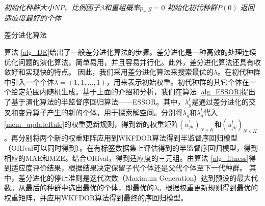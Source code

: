 \IncMargin{1em}
\begin{algorithm}
\emph{初始化种群大小$NP$、比例因子$\beta$和重组概率$p_{r}$}\;
\emph{$g=0$}\;
\emph{初始化初代种群$P(0)$}\;
\emph{返回适应度最好的个体}\;
\caption{差分进化算法}\label{alg_DE}
\end{algorithm}\DecMargin{1em}


算法 \ref{alg_DE}给出了一般差分进化算法的步骤。差分进化是一种高效的处理连续优化问题的演化算法，简单易用，并且容易并行化\citep{storn1997differential}。此外，差分进化算法还具有收敛好和实现快的特点\citep{price2006differential}。
因此，我们采用差分进化算法来搜索最优的\(\lambda\)。在初代种群中引入一个个体\(\lambda=(1,1,\dots,1)\)，用来表示初始权重。初代种群的其它个体在一个给定范围内随机生成。基于上面的介绍和分析，我们在算法 \ref{alg_ESSOR}提出了基于演化算法的半监督序回归算法——ESSOR。其中，\(\lambda_{g}^{t}\)是通过差分进化的交叉和变异算子产生的新的个体，用于探索解空间。分别将\(\lambda_{g}\)和\(\lambda_g^{t}\)代入\autoref{mem_updateRule}的权重更新规则，得到新的权重矩阵\((u_{jk}^{'})_{N \times K}\)和\((u_{jk}^{t})_{N \times K}\)。再分别将两个新的权重矩阵应用到WKFDOR算法得到半监督序回归模型（ORfval可以同时得到）。在有标签数据集上评估得到的半监督序回归模型，得到相应的MAE和MZE。结合ORfval，得到适应度的三元组。由算法 \ref{alg_fitness}得到适应度评价结果，根据结果决定保留子代个体还是父代个体至下一代种群。
其中，差分进化的停止准则是迭代次数（Maximum Generation）达到预设的最大代数。从最后的种群中选出最优的个体，即最优的\(\lambda\)。根据权重更新规则得到最优的权重矩阵，并应用WKFDOR算法得到最终的序回归模型。



